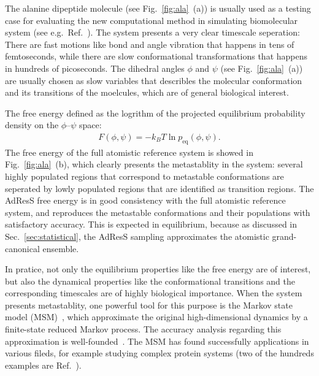 \documentclass[epjST]{svjour}
\newcommand{\equi}{{\textrm{eq}}}
\begin{document}
The alanine dipeptide molecule (see Fig.~\ref{fig:ala}~(a)) is usually
used as a testing case for evaluating the new computational method in simulating 
biomolecular system (see e.g.~Ref.~\cite{apostolakis1999calculation,chodera2007automatic,kaminsky2007force,gfeller2007complex}).
The system presents a very clear timescale seperation: There are fast
motions like bond and angle vibration that happens in tens of femtoseconds, while
there are slow conformational transformations that happens in hundreds of picoseconds.
The dihedral angles $\phi$ and $\psi$ (see
Fig.~\ref{fig:ala}~(a)) are usually chosen as slow variables that  describles
the molecular conformation and its transitions of the moelcules, which are of
general biological interest.

The free energy defined as the logrithm of the projected equilibrium probability density on the
$\phi$--$\psi$ space:
\begin{align}
  F(\phi,\psi) = -k_BT \ln p_\equi(\phi,\psi).
\end{align}
The free energy of the full atomistic reference system is showed in
Fig.~\ref{fig:ala}~(b), which clearly presents the metastablity in the
system: several highly populated regions that correspond to metastable
conformations are seperated by lowly populated regions that are
identified as transition regions.
The AdResS free energy is in good
consistency with the full atomistic reference system, and
reproduces the metastable conformations and their populations
with satisfactory accuracy.
This is expected in equilibrium, because as discussed in
Sec.~\ref{sec:statistical}, the AdResS sampling approximates the
atomistic grand-canonical ensemble.

In pratice, not only the equilibrium properties like the free energy are of interest,
but also the dynamical properties like the conformational transitions and the corresponding timescales
are of highly biological importance.
When the system presents metastablity,
one powerful tool for this purpose
is the Markov state model (MSM)~\cite{prinz2011probing,prinz2011markov,schuette2011markov}, which
approximate the original high-dimensional dynamics by a finite-state reduced
Markov process.
The accuracy analysis regarding  this approximation is well-founded~\cite{sarich2010approximation,djurdjevac2012estimating}.
The MSM has found successfully applications in various fileds, for example studying complex protein systems
(two of the hundreds examples are Ref.~\cite{noe2009constructing,kohlhoff2014cloud}).
\end{document}
